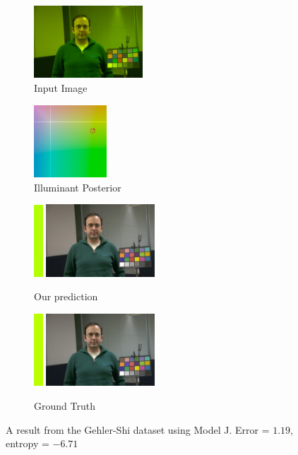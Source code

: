 \documentclass[10pt,twocolumn,letterpaper]{article}
\begin{document}
\begin{figure}[!]
\centering
  \begin{subfigure}[!]{1.7in}
    \includegraphics[width=1.6in]{figures/results/gehlershi/00000561_input.jpg}
    \caption{\footnotesize Input Image}
  \end{subfigure}
  \begin{subfigure}[!]{1.17in}
    \includegraphics[width=1.07in]{figures/results/gehlershi/00000561_chroma.png}
    \caption{\footnotesize Illuminant Posterior}
  \end{subfigure}
\begin{subfigure}[!]{1.9in}
    \includegraphics[width=0.133in]{figures/results/gehlershi/00000561_illum.png}\!
    \includegraphics[width=1.6in]{figures/results/gehlershi/00000561_prediction.jpg}
    \caption{\footnotesize Our prediction}
  \end{subfigure}
  \begin{subfigure}[!]{1.9in}
    \includegraphics[width=0.133in]{figures/results/gehlershi/00000561_illum_true.png}\!
    \includegraphics[width=1.6in]{figures/results/gehlershi/00000561_true.jpg}
    \caption{\footnotesize Ground Truth}
  \end{subfigure}
  \caption{
    A result from the Gehler-Shi dataset using Model J. Error = $1.19$\textdegree, entropy = $-6.71$
    \label{fig:results6}
  }
\end{figure}
\end{document}
